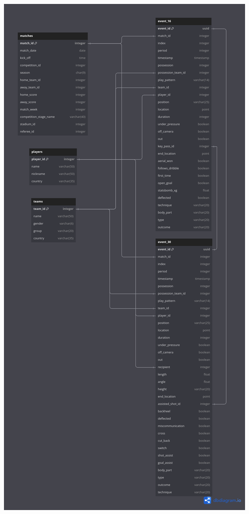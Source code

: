 \documentclass[12pt]{article}
\begin{document}
\includegraphics[width=\textwidth]{schema-diagram/event_16_30.png}
\end{document}
